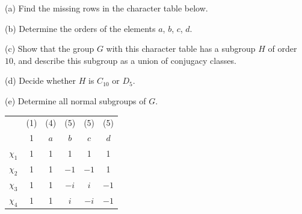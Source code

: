 \documentclass[10pt]{scrartcl}
\begin{document}
\begin{problem*}[4.10]
	(a) Find the missing rows in the character table below.
	
	(b) Determine the orders of the elements $a$, $b$, $c$, $d$.
	
	(c) Show that the group $G$ with this character table
	has a subgroup $H$ of order $10$, and describe this subgroup
	as a union of conjugacy classes.
	
	(d) Decide whether $H$ is $C_{10}$ or $D_5$.
	
	(e) Determine all normal subgroups of $G$.
	
	\begin{center}
		\begin{tabular}{c|ccccc}
			&(1)&(4)&(5)&(5)&(5)\\
			&1&$a$&$b$&$c$&$d$\\
			\hline
			$\chi_1$&1&1&1&1&1\\
			$\chi_2$&1&1&$-1$&$-1$&1\\
			$\chi_3$&1&1&$-i$&$i$&$-1$\\
			$\chi_4$&1&1&$i$&$-i$&$-1$
		\end{tabular}
	\end{center}
\end{problem*}
\end{document}
